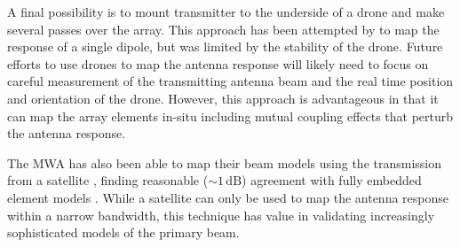 \begin{bibunit}
A final possibility is to mount transmitter to the underside of a drone and make several passes over
the array. This approach has been attempted by \citet{2017PASP..129c5002J} to map the response of a
single dipole, but was limited by the stability of the drone. Future efforts to use drones to map
the antenna response will likely need to focus on careful measurement of the transmitting antenna
beam and the real time position and orientation of the drone. However, this approach is advantageous
in that it can map the array elements in-situ including mutual coupling effects that perturb the
antenna response.

The MWA has also been able to map their beam models using the transmission from a satellite
\citep{2018arXiv180804516L}, finding reasonable ($\sim 1\,\text{dB}$) agreement with fully embedded
element models \citep{2017PASA...34...62S}. While a satellite can only be used to map the antenna
response within a narrow bandwidth, this technique has value in validating increasingly
sophisticated models of the primary beam.

\end{bibunit}

